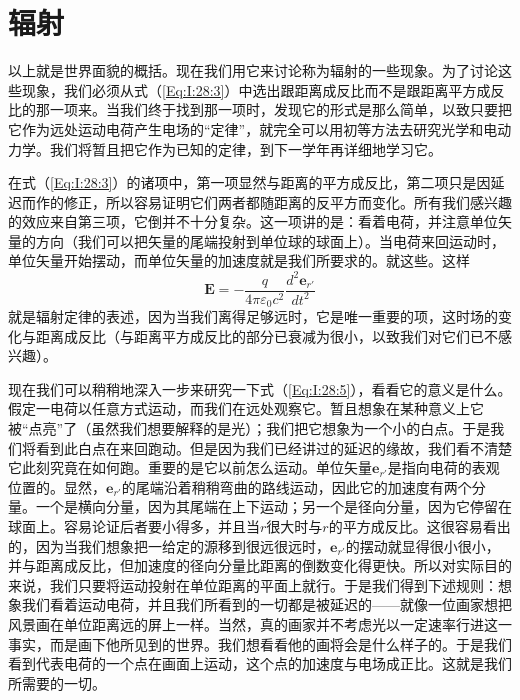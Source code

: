 \section{辐射}

以上就是世界面貌的概括。现在我们用它来讨论称为辐射的一些现象。为了讨论这些现象，我们必须从式（\ref{Eq:I:28:3}）中选出跟距离成反比而不是跟距离平方成反比的那一项来。当我们终于找到那一项时，发现它的形式是那么简单，以致只要把它作为远处运动电荷产生电场的“定律”，就完全可以用初等方法去研究光学和电动力学。我们将暂且把它作为已知的定律，到下一学年再详细地学习它。

在式（\ref{Eq:I:28:3}）的诸项中，第一项显然与距离的平方成反比，第二项只是因延迟而作的修正，所以容易证明它们两者都随距离的反平方而变化。所有我们感兴趣的效应来自第三项，它倒并不十分复杂。这一项讲的是：看着电荷，并注意单位矢量的方向（我们可以把矢量的尾端投射到单位球的球面上）。当电荷来回运动时，单位矢量开始摆动，而单位矢量的加速度就是我们所要求的。就这些。这样
\begin{equation}
    \label{Eq:I:28:5}
    \boldsymbol{E} = -\frac{q}{4\pi\varepsilon_0c^2} \frac{d^2\boldsymbol{e}_{r'}}{dt^2}
\end{equation}
就是辐射定律的表述，因为当我们离得足够远时，它是唯一重要的项，这时场的变化与距离成反比（与距离平方成反比的部分已衰减为很小，以致我们对它们已不感兴趣）。

现在我们可以稍稍地深入一步来研究一下式（\ref{Eq:I:28:5}），看看它的意义是什么。假定一电荷以任意方式运动，而我们在远处观察它。暂且想象在某种意义上它被“点亮”了（虽然我们想要解释的是光）；我们把它想象为一个小的白点。于是我们将看到此白点在来回跑动。但是因为我们已经讲过的延迟的缘故，我们看不清楚它此刻究竟在如何跑。重要的是它以前怎么运动。单位矢量$\boldsymbol{e}_{r'}$是指向电荷的表观位置的。显然，$\boldsymbol{e}_{r'}$的尾端沿着稍稍弯曲的路线运动，因此它的加速度有两个分量。一个是横向分量，因为其尾端在上下运动；另一个是径向分量，因为它停留在球面上。容易论证后者要小得多，并且当$r$很大时与$r$的平方成反比。这很容易看出的，因为当我们想象把一给定的源移到很远很远时，$\boldsymbol{e}_{r'}$的摆动就显得很小很小，并与距离成反比，但加速度的径向分量比距离的倒数变化得更快。所以对实际目的来说，我们只要将运动投射在单位距离的平面上就行。于是我们得到下述规则：想象我们看着运动电荷，并且我们所看到的一切都是被延迟的——就像一位画家想把风景画在单位距离远的屏上一样。当然，真的画家并不考虑光以一定速率行进这一事实，而是画下他所见到的世界。我们想看看他的画将会是什么样子的。于是我们看到代表电荷的一个点在画面上运动，这个点的加速度与电场成正比。这就是我们所需要的一切。

